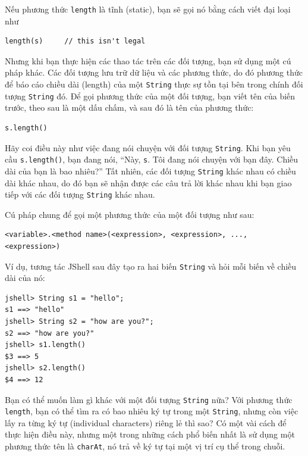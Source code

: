 Nếu phương thức \texttt{length} là tĩnh (static), bạn sẽ gọi nó bằng
cách viết đại loại như

\begin{verbatim}
length(s)     // this isn't legal
\end{verbatim}

Nhưng khi bạn thực hiện các thao tác trên các đối tượng, bạn sử dụng một
cú pháp khác. Các đối tượng lưu trữ dữ liệu và các phương thức, do đó
phương thức để báo cáo chiều dài (length) của một \texttt{String} thực
sự tồn tại bên trong chính đối tượng \texttt{String} đó. Để gọi phương
thức của một đối tượng, bạn viết tên của biến trước, theo sau là một dấu
chấm, và sau đó là tên của phương thức:

\begin{verbatim}
s.length()
\end{verbatim}

Hãy coi điều này như việc đang nói chuyện với đối tượng \texttt{String}.
Khi bạn yêu cầu \texttt{s.length()}, bạn đang nói, ``Này, \texttt{s}.
Tôi đang nói chuyện với bạn đây. Chiều dài của bạn là bao nhiêu?'' Tất
nhiên, các đối tượng \texttt{String} khác nhau có chiều dài khác nhau,
do đó bạn sẽ nhận được các câu trả lời khác nhau khi bạn giao tiếp với
các đối tượng \texttt{String} khác nhau.

Cú pháp chung để gọi một phương thức của một đối tượng như sau:

\begin{verbatim}
<variable>.<method name>(<expression>, <expression>, ..., <expression>)
\end{verbatim}

Ví dụ, tương tác JShell sau đây tạo ra hai biến \texttt{String} và hỏi
mỗi biến về chiều dài của nó:

\begin{verbatim}
jshell> String s1 = "hello";
s1 ==> "hello"
jshell> String s2 = "how are you?";
s2 ==> "how are you?"
jshell> s1.length()
$3 ==> 5
jshell> s2.length()
$4 ==> 12
\end{verbatim}

Bạn có thể muốn làm gì khác với một đối tượng \texttt{String} nữa? Với
phương thức \texttt{length}, bạn có thể tìm ra có bao nhiêu ký tự trong
một \texttt{String}, nhưng còn việc lấy ra từng ký tự (individual
characters) riêng lẻ thì sao? Có một vài cách để thực hiện điều này,
nhưng một trong những cách phổ biến nhất là sử dụng một phương thức tên
là \texttt{charAt}, nó trả về ký tự tại một vị trí cụ thể trong chuỗi.

